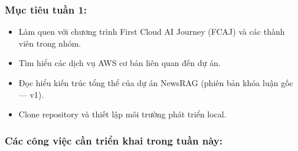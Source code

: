\hypertarget{mux1ee5c-tiuxeau-tuux1ea7n-1}{%
\subsubsection{Mục tiêu tuần 1:}}

\begin{itemize}
\tightlist
\item
  Làm quen với chương trình First Cloud AI Journey (FCAJ) và các thành
  viên trong nhóm.
\item
  Tìm hiểu các dịch vụ AWS cơ bản liên quan đến dự án.
\item
  Đọc hiểu kiến trúc tổng thể của dự án NewsRAG (phiên bản khóa luận gốc
  --- v1).
\item
  Clone repository và thiết lập môi trường phát triển local.
\end{itemize}

\hypertarget{cuxe1c-cuxf4ng-viux1ec7c-cux1ea7n-triux1ec3n-khai-trong-tuux1ea7n-nuxe0y}{%
\subsubsection{Các công việc cần triển khai trong tuần
này:}}

